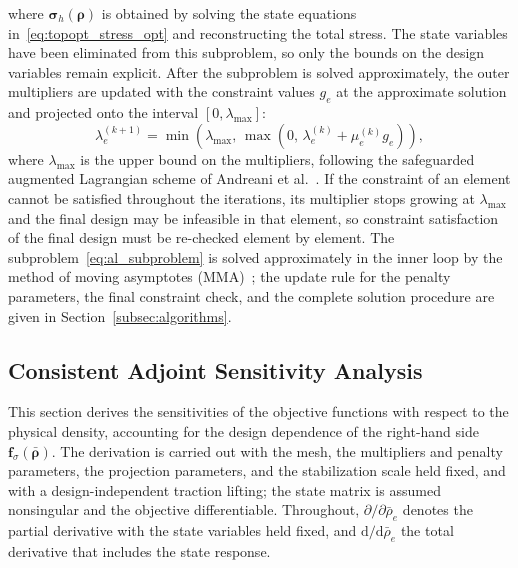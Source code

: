 where $\boldsymbol{\sigma}_h(\boldsymbol{\rho})$ is obtained by solving the state equations in~\eqref{eq:topopt_stress_opt} and reconstructing the total stress. The state variables have been eliminated from this subproblem, so only the bounds on the design variables remain explicit. After the subproblem is solved approximately, the outer multipliers are updated with the constraint values $g_e$ at the approximate solution and projected onto the interval $[0, \lambda_{\max}]$:
\begin{equation}
\label{eq:multiplier_update}
\lambda_e^{(k+1)} = \min\left(\lambda_{\max},\, \max\left(0,\, \lambda_e^{(k)} + \mu_e^{(k)} g_e\right)\right),
\end{equation}
where $\lambda_{\max}$ is the upper bound on the multipliers, following the safeguarded augmented Lagrangian scheme of Andreani et al.~\cite{Andreani2008}. If the constraint of an element cannot be satisfied throughout the iterations, its multiplier stops growing at $\lambda_{\max}$ and the final design may be infeasible in that element, so constraint satisfaction of the final design must be re-checked element by element. The subproblem~\eqref{eq:al_subproblem} is solved approximately in the inner loop by the method of moving asymptotes (MMA)~\cite{Svanberg1987}; the update rule for the penalty parameters, the final constraint check, and the complete solution procedure are given in Section~\ref{subsec:algorithms}.

\subsection{Consistent Adjoint Sensitivity Analysis}
\label{subsec:adjoint_sensitivity}

This section derives the sensitivities of the objective functions with respect to the physical density, accounting for the design dependence of the right-hand side $\boldsymbol{f}_\sigma(\bar{\boldsymbol{\rho}})$. The derivation is carried out with the mesh, the multipliers and penalty parameters, the projection parameters, and the stabilization scale held fixed, and with a design-independent traction lifting; the state matrix is assumed nonsingular and the objective differentiable. Throughout, $\partial/\partial\bar{\rho}_e$ denotes the partial derivative with the state variables held fixed, and $\mathrm{d}/\mathrm{d}\bar{\rho}_e$ the total derivative that includes the state response.


